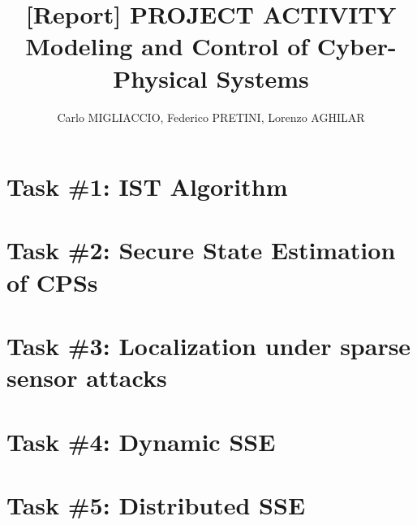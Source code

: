 \documentclass[a4paper, 12pt]{article}
\begin{document}
    
    \title{
        \vspace{-2cm}
        \textbf{
        [Report] PROJECT ACTIVITY \\
        Modeling and Control of Cyber-Physical Systems
        }
    }
    \author{
        Carlo MIGLIACCIO, Federico PRETINI, Lorenzo AGHILAR
    }
    \date{}
    
    \clearpage\maketitle
    \thispagestyle{empty}

    

    \section*{Task \#1: IST Algorithm}

    \section*{Task \#2: Secure State Estimation of CPSs}

    \section*{Task \#3: Localization under sparse sensor attacks}

    \section*{Task \#4: Dynamic SSE}

    \section*{Task \#5: Distributed SSE}
\end{document}
